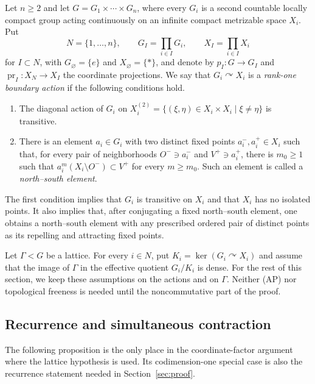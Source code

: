 \documentclass[11pt]{amsart}
\numberwithin{equation}{section}
\theoremstyle{definition}
\begin{document}
	Let $n\geq2$ and let $G=G_1\times\cdots\times G_n$, where every $G_i$ is a
	second countable locally compact group acting continuously
	on an infinite compact metrizable space $X_i$.  Put
	\[
	N=\{1,\ldots,n\},\qquad
	G_I=\prod_{i\in I}G_i,\qquad
	X_I=\prod_{i\in I}X_i
	\]
	for $I\subset N$, with $G_\varnothing=\{e\}$ and $X_\varnothing=\{*\}$, and denote by
	$p_I:G\to G_I$ and $\operatorname{pr}_I:X_N\to X_I$ the coordinate projections.
	We say that $G_i\curvearrowright X_i$ is a \emph{rank-one boundary action}
	if the following conditions hold.
	\begin{enumerate}[\rm (i)]
		\item The diagonal action of $G_i$ on
		$X_i^{(2)}=\{(\xi,\eta)\in X_i\times X_i\mid \xi\neq\eta\}$ is transitive.
		\item There is an element $a_i\in G_i$ with two distinct fixed points
		$a_i^-,a_i^+\in X_i$ such that, for every pair of neighborhoods
		$O^-\ni a_i^-$ and $V^+\ni a_i^+$, there is $m_0\geq1$ such that
		$a_i^m(X_i\setminus O^-)\subset V^+$ for every $m\geq m_0$. Such an element
		is called a \emph{north--south element}.
	\end{enumerate}
	The first condition implies that $G_i$ is transitive on $X_i$ and that $X_i$
	has no isolated points.  It also implies that, after conjugating a fixed
	north--south element, one obtains a north--south element with any prescribed
	ordered pair of distinct points as its repelling and attracting fixed points.
	
	Let $\Gamma<G$ be a lattice. For every $i\in N$, put
	$K_i=\ker(G_i\curvearrowright X_i)$ and assume that the image of $\Gamma$
	in the effective quotient $G_i/K_i$ is dense. For the rest of this section, we keep these
	assumptions on the actions and on $\Gamma$. Neither {\rm(AP)} nor topological
	freeness is needed until the noncommutative part of the proof.
	
	\subsection{Recurrence and simultaneous contraction}
	
	The following proposition is the only place in the coordinate-factor argument
	where the lattice hypothesis is used.  Its codimension-one special case is also
	the recurrence statement needed in Section~\ref{sec:proof}.
	
\end{document}

